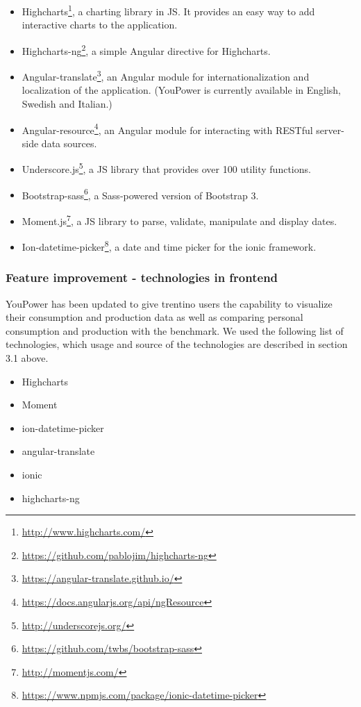 \begin{itemize}

\item Highcharts\footnote{\url{http://www.highcharts.com/}}, a charting library in JS. It provides an easy way to add interactive charts to the application. 

\item Highcharts-ng\footnote{\url{https://github.com/pablojim/highcharts-ng}}, a simple Angular directive for Highcharts. 

\item Angular-translate\footnote{\url{https://angular-translate.github.io/}}, an Angular module for internationalization and localization of the application. (YouPower is currently available in English, Swedish and Italian.)

\item Angular-resource\footnote{\url{https://docs.angularjs.org/api/ngResource}}, an Angular module for interacting with RESTful server-side data sources. 

\item Underscore.js\footnote{\url{http://underscorejs.org/}}, a JS library that provides over 100 utility functions. 

\item Bootstrap-sass\footnote{\url{https://github.com/twbs/bootstrap-sass}}, a Sass-powered version of Bootstrap 3. 

\item Moment.js\footnote{\url{http://momentjs.com/}}, a JS library to parse, validate, manipulate and display dates. 

\item Ion-datetime-picker\footnote{\url{https://www.npmjs.com/package/ionic-datetime-picker}}, a date and time picker for the ionic framework. 

\end{itemize}
\subsubsection{Feature improvement - technologies in frontend}
YouPower has been updated to give trentino users the capability to visualize their consumption and production data as well as comparing personal consumption and production with the benchmark. We used the following list of technologies, which usage and source of the technologies are described in section 3.1 above. 
\begin{itemize}
\item Highcharts
\item Moment
\item ion-datetime-picker
\item angular-translate
\item ionic
\item highcharts-ng
\end{itemize}
